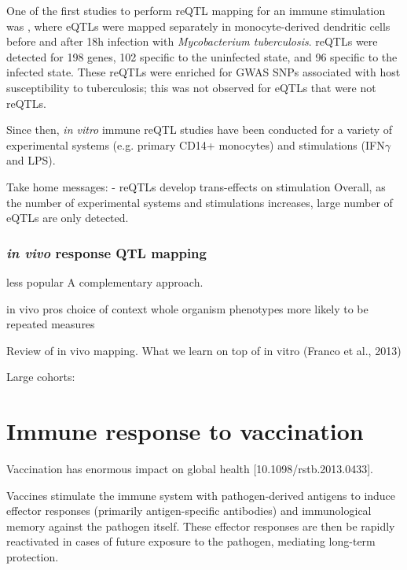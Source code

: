 One of the first studies to perform \gls{reQTL} mapping for an immune stimulation was \autocite{barreiro2012DecipheringGeneticArchitecture}, where eQTLs were mapped separately in monocyte-derived dendritic cells before and after 18h infection with \textit{Mycobacterium tuberculosis}.
reQTLs were detected for 198 genes, 102 specific to the uninfected state, and 96 specific to the infected state. 
These reQTLs were enriched for GWAS SNPs associated with host susceptibility to tuberculosis; this was not observed for eQTLs that were not reQTLs.

Since then, \textit{in vitro} immune reQTL studies have been conducted for a variety of experimental systems (e.g. primary CD14+ monocytes\autocite{fairfax2014InnateImmuneActivity}) and stimulations (IFN$\gamma$ and LPS\autocite{fairfax2014GeneticsGeneExpression}).

Take home messages:
- reQTLs develop trans-effects on stimulation \autocite{fairfax2014InnateImmuneActivity}
Overall, as the number of experimental systems and stimulations increases, large number of eQTLs are only detected.

\subsubsection{\textit{in vivo} response QTL mapping}

less popular
A complementary approach.

in vivo pros
    choice of context 
    whole organism phenotypes
    more likely to be repeated measures

Review of in vivo mapping.
What we learn on top of in vitro
(Franco et al., 2013)

Large cohorts: 

\section{Immune response to vaccination}

Vaccination has enormous impact on global health [10.1098/rstb.2013.0433].

Vaccines stimulate the immune system with pathogen-derived antigens to induce effector responses (primarily antigen-specific antibodies) and immunological memory against the pathogen itself.
These effector responses are then be rapidly reactivated in cases of future exposure to the pathogen, mediating long-term protection.

